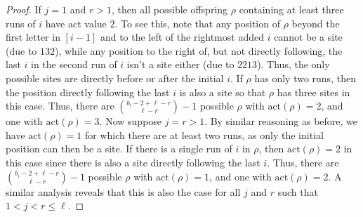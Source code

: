 \documentclass[11pt]{amsart}
\theoremstyle{plain}
\theoremstyle{definition}
\begin{document}
\begin{proof}
If $j=1$ and $r>1$, then all possible offspring $\rho$ containing at least three runs of $i$ have
act value $2$.  To see this, note that any position of $\rho$ beyond the first letter in $[i-1]$ and
to the left of the rightmost added $i$ cannot be a site (due to $132$), while any position to the
right of, but not directly following, the last $i$ in the second run of $i$ isn't a site either (due
to $2213$).  Thus, the only possible sites are directly before or after the initial $i$.  If $\rho$
has only two runs, then the position directly following the last $i$ is also a site so that $\rho$
has three sites in this case.  Thus, there are $\binom{b_i-2+\ell-r}{\ell-r}-1$ possible $\rho$ with
$\text{act}(\rho)=2$, and one with $\text{act}(\rho)=3$.  Now suppose $j=r>1$.  By similar reasoning
as before, we have $\text{act}(\rho)=1$ for which there are at least two runs, as only the initial
position can then be a site.  If there is a single run of $i$ in $\rho$, then $\text{act}(\rho)=2$ in
this case since there is also a site directly following the last $i$.  Thus, there are
$\binom{b_i-2+\ell-r}{\ell-r}-1$ possible $\rho$ with $\text{act}(\rho)=1$, and one with
$\text{act}(\rho)=2$.  A similar analysis reveals that this is also the case for all $j$ and $r$ such
that $1 < j < r \leq \ell$.


\end{proof}
\end{document}
